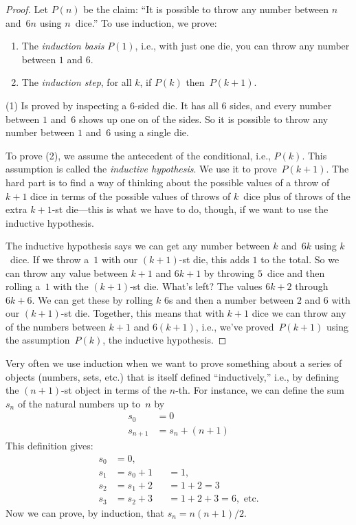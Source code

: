 \documentclass[../../../include/open-logic-section]{subfiles}
\begin{document}
\begin{proof}
Let $P(n)$ be the claim: ``It is possible to throw any number between
$n$ and~$6n$ using $n$~dice.''  To use induction, we prove:
\begin{enumerate}
\item The \emph{induction basis} $P(1)$, i.e., with just one die,
  you can throw any number between $1$ and $6$.
\item The \emph{induction step}, for all $k$, if $P(k)$ then~$P(k+1)$.
\end{enumerate}

(1) Is proved by inspecting a $6$-sided die. It has all 6 sides, and
every number between $1$ and~$6$ shows up one on of the sides. So it
is possible to throw any number between $1$ and~$6$ using a single
die.

To prove (2), we assume the antecedent of the conditional, i.e.,
$P(k)$. This assumption is called the \emph{inductive hypothesis}.  We
use it to prove~$P(k+1)$. The hard part is to find a way of thinking
about the possible values of a throw of $k+1$ dice in terms of the
possible values of throws of $k$~dice plus of throws of the extra
$k+1$-st die---this is what we have to do, though, if we want to use
the inductive hypothesis.

The inductive hypothesis says we can get any number between $k$
and~$6k$ using $k$~dice.  If we throw a~$1$ with our $(k+1)$-st die,
this adds $1$ to the total. So we can throw any value between $k+1$
and $6k+1$ by throwing $5$~dice and then rolling a~$1$ with the
$(k+1)$-st die.  What's left?  The values $6k+2$ through $6k+6$.  We
can get these by rolling $k$ $6$s and then a number between $2$ and
$6$ with our $(k+1)$-st die. Together, this means that with $k+1$ dice
we can throw any of the numbers between $k+1$ and $6(k+1)$, i.e.,
we've proved~$P(k+1)$ using the assumption~$P(k)$, the inductive
hypothesis.
\end{proof}

Very often we use induction when we want to prove something about a
series of objects (numbers, sets, etc.) that is itself defined
``inductively,'' i.e., by defining the $(n+1)$-st object in terms of
the $n$-th.  For instance, we can define the sum~$s_n$ of the natural
numbers up to~$n$ by
\begin{align*}
  s_0 & = 0\\
  s_{n+1} & = s_n + (n+1)
\end{align*}
This definition gives:
\begin{align*}
  s_0 & = 0,\\
  s_1 & = s_0 + 1 && = 1,\\
  s_2 & = s_1 + 2 && = 1 + 2 = 3\\
  s_3 & = s_2 + 3 && = 1 + 2 + 3 = 6, \text{ etc.}
\end{align*}
Now we can prove, by induction, that $s_n = n(n+1)/2$.
\end{document}
